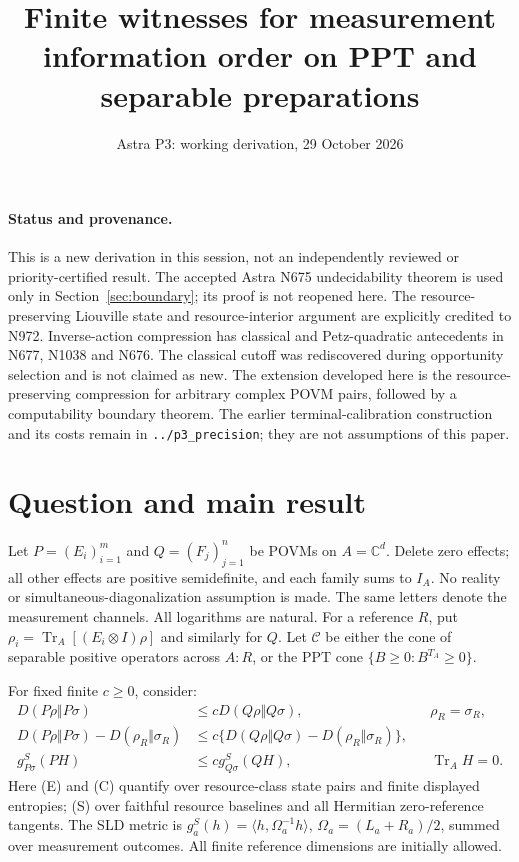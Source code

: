 \documentclass[11pt]{article}
\title{Finite witnesses for measurement information order on PPT and separable preparations}
\author{Astra P3: working derivation, 29 October 2026}
\date{}
\newcommand{\Tr}{\operatorname{Tr}}
\newcommand{\C}{\mathbb C}
\begin{document}
\maketitle

\paragraph{Status and provenance.}
This is a new derivation in this session, not an independently reviewed or
priority-certified result. The accepted Astra N675 undecidability theorem is
used only in Section~\ref{sec:boundary}; its proof is not reopened here.
The resource-preserving Liouville state and resource-interior argument are
explicitly credited to N972. Inverse-action compression has classical and
Petz-quadratic antecedents in N677, N1038 and N676. The classical cutoff was
rediscovered during opportunity selection and is not claimed as new.
The extension developed here is the resource-preserving compression for
arbitrary complex POVM pairs, followed by a computability boundary theorem.
The earlier terminal-calibration construction and its costs remain in
\texttt{../p3\_precision}; they are not assumptions of this paper.

\section{Question and main result}
Let $P=(E_i)_{i=1}^m$ and $Q=(F_j)_{j=1}^n$ be POVMs on
$A=\C^d$. Delete zero effects; all other effects are positive semidefinite,
and each family sums to $I_A$. No reality or simultaneous-diagonalization
assumption is made. The same letters denote the measurement channels.
All logarithms are natural. For a reference $R$, put
$\rho_i=\Tr_A[(E_i\otimes I)\rho]$ and similarly for $Q$.
Let $\mathcal C$ be either the cone of separable positive operators across
$A:R$, or the PPT cone $\{B\geq0:B^{T_A}\geq0\}$.

For fixed finite $c\geq0$, consider:
\begin{align}
 D(P\rho\Vert P\sigma)&\leq cD(Q\rho\Vert Q\sigma),
       &&\rho_R=\sigma_R,                                      \tag{E}\label{eq:E}\\
 D(P\rho\Vert P\sigma)-D(\rho_R\Vert\sigma_R)
   &\leq c\{D(Q\rho\Vert Q\sigma)-D(\rho_R\Vert\sigma_R)\},     \tag{C}\label{eq:C}\\
 g^S_{P\sigma}(PH)&\leq c g^S_{Q\sigma}(QH),
       &&\Tr_A H=0.                                           \tag{S}\label{eq:S}
\end{align}
Here (E) and (C) quantify over resource-class state pairs and finite displayed
entropies; (S) over faithful resource baselines and all Hermitian zero-reference
tangents. The SLD metric is $g^S_a(h)=\langle h,\Omega_a^{-1}h\rangle$,
$\Omega_a=(L_a+R_a)/2$, summed over measurement outcomes.
All finite reference dimensions are initially allowed.
\end{document}
